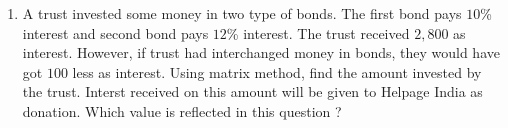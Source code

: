 \begin{enumerate}
    \item A trust invested some money in two type of bonds. The first bond pays $10$\% interest and second bond pays $12$\% interest. The trust received \rupee $2,800$ as interest. However, if trust had interchanged money in bonds, they would have got \rupee $100$ less as interest. Using matrix method, find the amount invested by the trust. Interst received on this amount will be given to Helpage India as donation. Which value is reflected in this question ?
\end{enumerate}